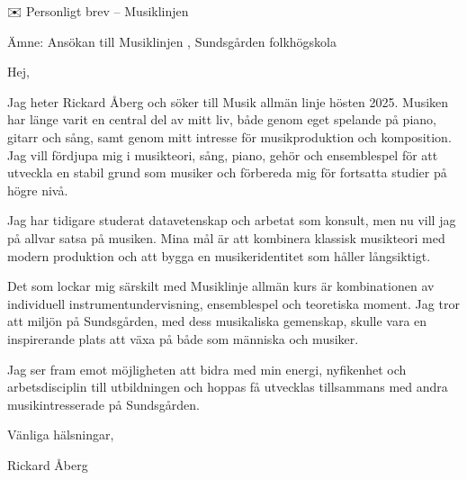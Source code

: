 \documentclass[a4paper,10pt]{letter}
\begin{document}
\begin{letter}{✉️ Personligt brev – Musiklinjen 

Ämne: Ansökan till Musiklinjen , Sundsgården folkhögskola}
\opening{Hej,}

Jag heter Rickard Åberg och söker till Musik allmän linje hösten 2025.
Musiken har länge varit en central del av mitt liv, både genom eget spelande på piano, gitarr och sång, samt genom mitt intresse för musikproduktion och komposition. Jag vill fördjupa mig i musikteori, sång, piano, gehör och ensemblespel för att utveckla en stabil grund som musiker och förbereda mig för fortsatta studier på högre nivå.

Jag har tidigare studerat datavetenskap och arbetat som konsult, men nu vill jag på allvar satsa på musiken. Mina mål är att kombinera klassisk musikteori med modern produktion och att bygga en musikeridentitet som håller långsiktigt.

Det som lockar mig särskilt med Musiklinje allmän kurs är kombinationen av individuell instrumentundervisning, ensemblespel och teoretiska moment. Jag tror att miljön på Sundsgården, med dess musikaliska gemenskap, skulle vara en inspirerande plats att växa på både som människa och musiker.

Jag ser fram emot möjligheten att bidra med min energi, nyfikenhet och arbetsdisciplin till utbildningen och hoppas få utvecklas tillsammans med andra musikintresserade på Sundsgården.
\closing{Vänliga hälsningar,}

\vspace{1em}

Rickard Åberg\\
[0709431401] \\
[raberg@duck.com]
\end{letter}
\end{document}
